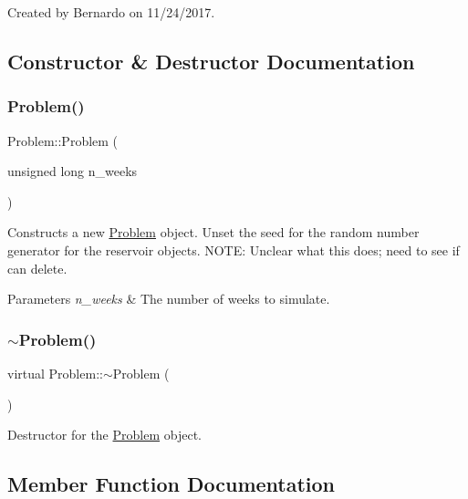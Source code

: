 Created by Bernardo on 11/24/2017. 

\subsection{Constructor \& Destructor Documentation}
\mbox{\label{classProblem_a41939e01b382197124fcd9f5e8c7520d}} 
\subsubsection{\texorpdfstring{Problem()}{Problem()}}
{\footnotesize\ttfamily Problem\+::\+Problem (\begin{DoxyParamCaption}\item[{unsigned long}]{n\+\_\+weeks }\end{DoxyParamCaption})}



Constructs a new \mbox{\hyperlink{classProblem}{Problem}} object. Unset the seed for the random number generator for the reservoir objects. N\+O\+TE\+: Unclear what this does; need to see if can delete. 


\begin{DoxyParams}{Parameters}
{\em n\+\_\+weeks} & The number of weeks to simulate. \\
\hline
\end{DoxyParams}
\mbox{\label{classProblem_af175051c1f08660690573aa0021e4106}} 
\subsubsection{\texorpdfstring{$\sim$\+Problem()}{~Problem()}}
{\footnotesize\ttfamily virtual Problem\+::$\sim$\+Problem (\begin{DoxyParamCaption}{ }\end{DoxyParamCaption})\hspace{0.3cm}{\ttfamily [virtual]}}



Destructor for the \mbox{\hyperlink{classProblem}{Problem}} object. 



\subsection{Member Function Documentation}
\mbox{\label{classProblem_a195a32a960235513064a089c2472b44f}} 

